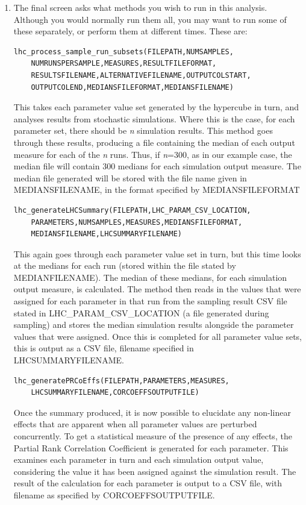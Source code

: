 \documentclass[a4paper,11pt]{article}
\begin{document}
\begin{enumerate}
\item The final screen asks what methods you wish to run in this analysis. Although you would normally run them all, you may want to run some of these separately, or perform them at different times. These are:

\begin{verbatim}
lhc_process_sample_run_subsets(FILEPATH,NUMSAMPLES,
	NUMRUNSPERSAMPLE,MEASURES,RESULTFILEFORMAT,
	RESULTSFILENAME,ALTERNATIVEFILENAME,OUTPUTCOLSTART,
	OUTPUTCOLEND,MEDIANSFILEFORMAT,MEDIANSFILENAME)
\end{verbatim}

This takes each parameter value set generated by the hypercube in turn, and analyses results from stochastic simulations. Where this is the case, for each parameter set, there should be \textit{n} simulation results. This method goes through these results, producing a file containing the median of each output measure for each of the \textit{n} runs. Thus, if \textit{n}=300, as in our example case, the median file will contain 300 medians for each simulation output measure. The median file generated will be stored with the file name given in MEDIANSFILENAME, in the format specified by MEDIANSFILEFORMAT\\

\begin{verbatim}
lhc_generateLHCSummary(FILEPATH,LHC_PARAM_CSV_LOCATION,
	PARAMETERS,NUMSAMPLES,MEASURES,MEDIANSFILEFORMAT,
	MEDIANSFILENAME,LHCSUMMARYFILENAME)
\end{verbatim}

This again goes through each parameter value set in turn, but this time looks at the medians for each run (stored within the file stated by MEDIANFILENAME). The median of these medians, for each simulation output measure, is calculated. The method then reads in the values that were assigned for each parameter in that run from the sampling result CSV file stated in LHC\_PARAM\_CSV\_LOCATION (a file generated during sampling) and stores the median simulation results alongside the parameter values that were assigned. Once this is completed for all parameter value sets, this is output as a CSV file, filename specified in LHCSUMMARYFILENAME.

\begin{verbatim}
lhc_generatePRCoEffs(FILEPATH,PARAMETERS,MEASURES,
	LHCSUMMARYFILENAME,CORCOEFFSOUTPUTFILE)
\end{verbatim}

Once the summary produced, it is now possible to elucidate any non-linear effects that are apparent when all parameter values are perturbed concurrently. To get a statistical measure of the presence of any effects, the Partial Rank Correlation Coefficient is generated for each parameter. This examines each parameter in turn and each simulation output value, considering the value it has been assigned against the simulation result.  The result of the calculation for each parameter is output to a CSV file, with filename as specified by CORCOEFFSOUTPUTFILE.


\end{enumerate}
\end{document}

